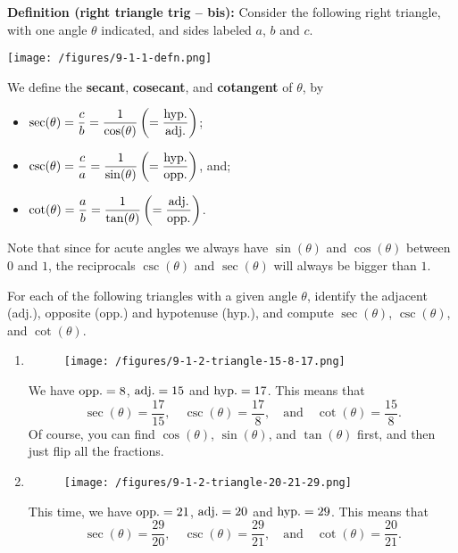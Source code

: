 \documentclass{ximera}
\begin{document}
\begin{callout}
  {\bf Definition (right triangle trig -- bis):} Consider the following right triangle, with one angle $\theta$ indicated, and sides labeled $a$, $b$ and $c$.

  \begin{center}
    \texttt{[image: /figures/9-1-1-defn.png]}
  \end{center}

  
  We define the {\bf secant}, {\bf cosecant}, and {\bf cotangent} of $\theta$, by
  \begin{itemize}
  \item $\displaystyle{\sec(\theta) = \frac{c}{b} = \frac{1}{\cos(\theta)} \left(= \frac{\rm hyp.}{\rm adj.}\right)}$;
  \item $\displaystyle{\csc(\theta) = \frac{c}{a}=\frac{1}{\sin(\theta)}\left(=\frac{\rm hyp.}{\rm opp.}\right)}$, and;
  \item $\displaystyle{\cot(\theta) = \frac{a}{b}=\frac{1}{\tan(\theta)} \left(= \frac{\rm adj.}{\rm opp.}\right)}$.
  \end{itemize}
\end{callout}

Note that since for acute angles we always have $\sin(\theta)$ and $\cos(\theta)$ between $0$ and $1$, the reciprocals $\csc(\theta)$ and $\sec(\theta)$ will always be bigger than $1$.


\begin{example}
  For each of the following triangles with a given angle $\theta$, identify the adjacent (adj.), opposite (opp.) and hypotenuse (hyp.), and compute $\sec(\theta)$, $\csc(\theta)$, and $\cot(\theta)$.
  \begin{enumerate}[label=\alph*.]
  \item  \begin{figure}[h]
      \centering
      \texttt{[image: /figures/9-1-2-triangle-15-8-17.png]}
    \end{figure}
    \begin{explanation}
      We have ${\rm opp.} = 8$, ${\rm adj.} = 15$ and ${\rm hyp.} = 17$. This means that $$\sec(\theta) = \frac{17}{15}, \quad \csc(\theta) =\frac{17}{8}, \quad\mbox{and}\quad \cot(\theta) =\frac{15}{8}. $$Of course, you can find $\cos(\theta)$, $\sin(\theta)$, and $\tan(\theta)$ first, and then just flip all the fractions.
    \end{explanation}
  \item \begin{figure}[h]
      \centering
      \texttt{[image: /figures/9-1-2-triangle-20-21-29.png]}
    \end{figure}
    \begin{explanation}
      This time, we have ${\rm opp.} = 21$, ${\rm adj.} = 20$ and ${\rm hyp.} = 29$. This means that $$\sec(\theta) = \frac{29}{20}, \quad \csc(\theta) =\frac{29}{21}, \quad\mbox{and}\quad \cot(\theta) =\frac{20}{21}. $$
    \end{explanation}
  \end{enumerate}
\end{example}
\end{document}
